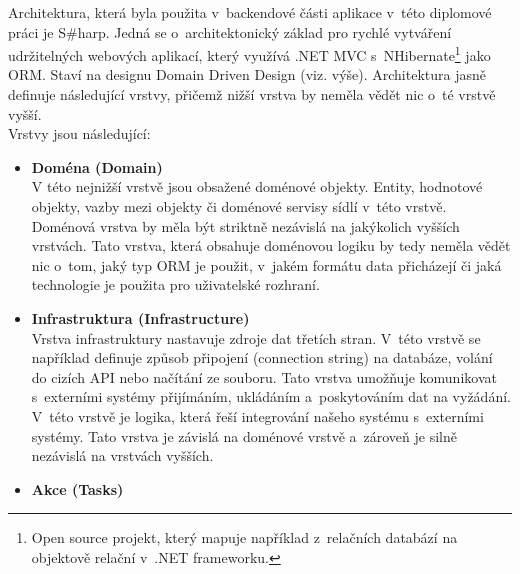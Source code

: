 
Architektura, která byla použita v~backendové části aplikace v~této diplomové práci je S\#harp. Jedná se o~architektonický základ pro rychlé vytváření udržitelných webových aplikací, který využívá .NET MVC s~NHibernate\footnote{Open source projekt, který mapuje například z~relačních databází na objektově relační v~.NET frameworku.} jako ORM. Staví na designu Domain Driven Design (viz. výše). Architektura jasně definuje následující vrstvy, přičemž nižší vrstva by neměla vědět nic o~té vrstvě vyšší. \\

Vrstvy jsou následující:

\begin{itemize}
	\item \textbf{Doména (Domain)} \\
	V této nejnižší vrstvě jsou obsažené doménové objekty. Entity, hodnotové objekty, vazby mezi objekty či doménové servisy sídlí v~této vrstvě. Doménová vrstva by měla být striktně nezávislá na jakýkolich vyšších vrstvách. Tato vrstva, která obsahuje doménovou logiku by tedy neměla vědět nic o~tom, jaký typ ORM je použit, v~jakém formátu data přicházejí či jaká technologie je použita pro uživatelské rozhraní. 
	\item \textbf{Infrastruktura (Infrastructure)} \\
	Vrstva infrastruktury nastavuje zdroje dat třetích stran. V~této vrstvě se například definuje způsob připojení (connection string) na databáze, volání do cizích API nebo načítání ze souboru. Tato vrstva umožňuje komunikovat s~externími systémy přijímáním, ukládáním a~poskytováním dat na vyžádání. V~této vrstvě je logika, která řeší integrování našeho systému s~externími systémy. Tato vrstva je závislá na doménové vrstvě a~zároveň je silně nezávislá na vrstvách vyšších.
	\item \textbf{Akce (Tasks)} \\

\end{itemize}

